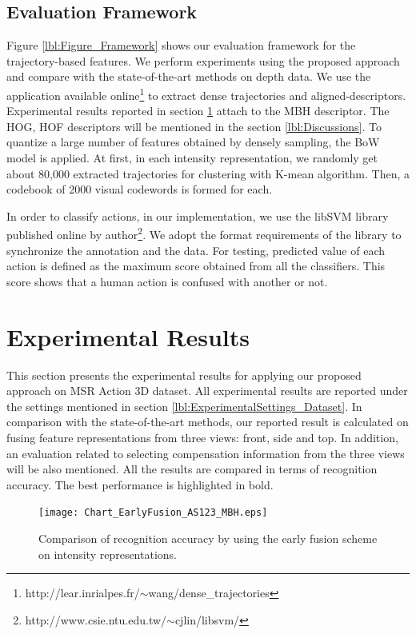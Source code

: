 \documentclass[final,3p,times,twocolumn]{elsarticle}
\begin{document}
\subsection{Evaluation Framework}

Figure \ref{lbl:Figure_Framework} shows our evaluation framework for the trajectory-based features. We perform experiments using the proposed approach and compare with the state-of-the-art methods on depth data. We use the application available online\footnote{http://lear.inrialpes.fr/$\sim$wang/dense\_trajectories} to extract dense trajectories and aligned-descriptors. Experimental results reported in section \ref{lbl:ExperimentalResults} attach to the MBH descriptor. The HOG, HOF descriptors will be mentioned in the section \ref{lbl:Discussions}. To quantize a large number of features obtained by densely sampling, the BoW model is applied. At first, in each intensity representation, we randomly get about 80,000 extracted trajectories for clustering with K-mean algorithm. Then, a codebook of 2000 visual codewords is formed for each.

In order to classify actions, in our implementation, we use the libSVM library published online by author\footnote{http://www.csie.ntu.edu.tw/$\sim$cjlin/libsvm/}. We adopt the format requirements of the library to synchronize the annotation and the data. For testing, predicted value of each action is defined as the maximum score obtained from all the classifiers. This score shows that a human action is confused with another or not.

\section{Experimental Results}
\label{lbl:ExperimentalResults}
This section presents the experimental results for applying our proposed approach on MSR Action 3D dataset. All experimental results are reported under the settings mentioned in section \ref{lbl:ExperimentalSettings_Dataset}. In comparison with the state-of-the-art methods, our reported result is calculated on fusing feature representations from three views: front, side and top. In addition, an evaluation related to selecting compensation information from the three views will be also mentioned. All the results are compared in terms of recognition accuracy. The best performance is highlighted in bold.

\begin{figure}[h]
	\begin{center}
		\texttt{[image: Chart\_EarlyFusion\_AS123\_MBH.eps]}
	\end{center}
	\caption{\label{lbl:Figure_EarlyFusion_AS123_MBH}Comparison of recognition accuracy by using the early fusion scheme on intensity representations.}
\end{figure}
\end{document}

